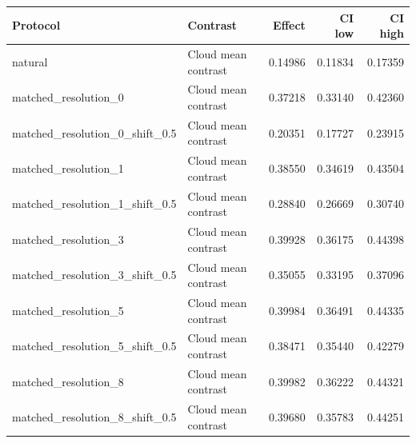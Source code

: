 \begin{tabular}{llrrr}
Protocol & Contrast & Effect & CI low & CI high \\
\hline
natural & Cloud mean contrast & 0.14986 & 0.11834 & 0.17359 \\
matched\_resolution\_0 & Cloud mean contrast & 0.37218 & 0.33140 & 0.42360 \\
matched\_resolution\_0\_shift\_0.5 & Cloud mean contrast & 0.20351 & 0.17727 & 0.23915 \\
matched\_resolution\_1 & Cloud mean contrast & 0.38550 & 0.34619 & 0.43504 \\
matched\_resolution\_1\_shift\_0.5 & Cloud mean contrast & 0.28840 & 0.26669 & 0.30740 \\
matched\_resolution\_3 & Cloud mean contrast & 0.39928 & 0.36175 & 0.44398 \\
matched\_resolution\_3\_shift\_0.5 & Cloud mean contrast & 0.35055 & 0.33195 & 0.37096 \\
matched\_resolution\_5 & Cloud mean contrast & 0.39984 & 0.36491 & 0.44335 \\
matched\_resolution\_5\_shift\_0.5 & Cloud mean contrast & 0.38471 & 0.35440 & 0.42279 \\
matched\_resolution\_8 & Cloud mean contrast & 0.39982 & 0.36222 & 0.44321 \\
matched\_resolution\_8\_shift\_0.5 & Cloud mean contrast & 0.39680 & 0.35783 & 0.44251 \\
\end{tabular}
